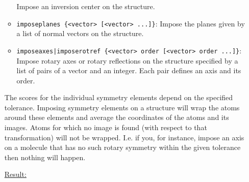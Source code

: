 \begin{itemize}
\begin{itemize}
    Impose an inversion center on the structure.
  \item {\tt imposeplanes \{<vector> [<vector> ...]\}}:
    Impose the planes given by a list of normal vectors on the
    structure.
  \item {\tt imposeaxes|imposerotref \{<vector> order [<vector> order ...]\}}:\\
    Impose rotary axes or rotary reflections on the structure
    specified by a list of pairs of a vector and an integer.
    Each pair defines an axis and its order.
  \end{itemize}
  The scores for the individual symmetry elements depend on the
  specified tolerance.
  Imposing symmetry elements on a structure will wrap the atoms
  around these elements and average the coordinates of the atoms
  and its images. Atoms for which no image is found (with respect
  to that transformation) will not be wrapped. I.e. if you, for
  instance, impose an axis on a molecule that has no such rotary
  symmetry within the given tolerance then nothing will happen.
  

  \underline{Result:}


\end{itemize}
